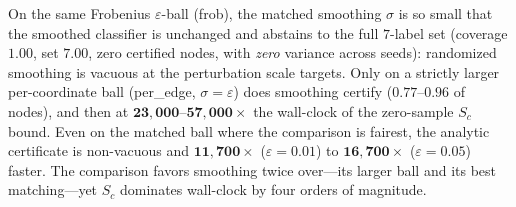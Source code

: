 On the same Frobenius $\varepsilon$-ball (frob), the matched smoothing $\sigma$ is so small that the smoothed classifier is unchanged and abstains to the full $7$-label set (coverage $1.00$, set $7.00$, zero certified nodes, with \emph{zero} variance across seeds): randomized smoothing is vacuous at the perturbation scale \AEGIS targets. Only on a strictly larger per-coordinate ball (per\_edge, $\sigma{=}\varepsilon$) does smoothing certify ($0.77$--$0.96$ of nodes), and then at $\mathbf{23{,}000}$--$\mathbf{57{,}000}\times$ the wall-clock of the zero-sample $S_c$ bound. Even on the matched ball where the comparison is fairest, the analytic certificate is non-vacuous and $\mathbf{11{,}700}\times$ ($\varepsilon{=}0.01$) to $\mathbf{16{,}700}\times$ ($\varepsilon{=}0.05$) faster. The comparison favors smoothing twice over---its larger ball and its best matching---yet $S_c$ dominates wall-clock by four orders of magnitude.
